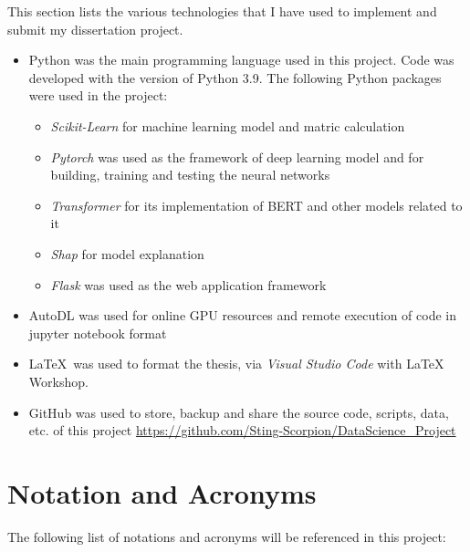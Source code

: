 \documentclass[ %
                    author={Louis Wang},
                supervisor={Dr. Qiang Liu},
                    degree={MSc},
                     title={Identification of Suicide Ideation in Texts},
                      type={},
                      year={2024}]{dissertation}
\begin{document}
\noindent
This section lists the various technologies that I have used to implement and submit my dissertation project.

\begin{itemize}

\item Python was the main programming language used in this project. Code was developed with the version of Python 3.9. 
The following Python packages were used in the project:

\begin{itemize}
      \item {\em Scikit-Learn} for machine learning model and matric calculation
      \item {\em Pytorch} was used as the framework of deep learning model and for building, training and testing the neural networks
      \item {\em Transformer} for its implementation of BERT and other models related to it
      \item {\em Shap} for model explanation
      \item {\em Flask} was used as the web application framework 
\end{itemize}

\item AutoDL was used for online GPU resources and remote execution of code in jupyter notebook format
 
\item \LaTeX\ was used to format the thesis, via {\em Visual Studio Code} with LaTeX Workshop. 

\item GitHub was used to store, backup and share the source code, scripts, data, etc. of this project
\url{https://github.com/Sting-Scorpion/DataScience_Project}

\end{itemize}


\chapter*{Notation and Acronyms}

\noindent
The following list of notations and acronyms will be referenced in this project:
\end{document}
